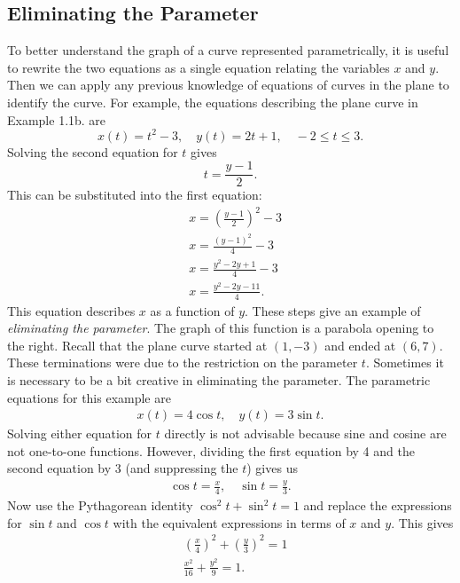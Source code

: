 \documentclass{report}
\begin{document}
    \pagebreak \bigbreak \noindent 
    \subsection{Eliminating the Parameter}
    \bigbreak \noindent 
    To better understand the graph of a curve represented parametrically, it is useful to rewrite the two equations as a single equation relating the variables \( x \) and \( y \). Then we can apply any previous knowledge of equations of curves in the plane to identify the curve. For example, the equations describing the plane curve in Example 1.1b. are
    \[
        x(t) = t^2 - 3, \quad y(t) = 2t + 1, \quad -2 \leq t \leq 3.
    \]
    Solving the second equation for \( t \) gives
    \[
        t = \frac{y - 1}{2}.
    \]
    This can be substituted into the first equation:
    \begin{align*}
        &x = \left(\frac{y-1}{2}\right)^{2} - 3 \\
        &x = \frac{(y-1)^{2}}{4} - 3 \\
        &x = \frac{y^{2}-2y+1}{4}-3 \\
        &x = \frac{y^{2}-2y-11}{4}
    .\end{align*}
    This equation describes \( x \) as a function of \( y \). These steps give an example of \textit{eliminating the parameter}. The graph of this function is a parabola opening to the right. Recall that the plane curve started at \( (1, -3) \) and ended at \( (6, 7) \). These terminations were due to the restriction on the parameter \( t \).
    \bigbreak \noindent 
    Sometimes it is necessary to be a bit creative in eliminating the parameter. The parametric equations for this example are
    \begin{align*}
        x(t) = 4\cos{t}, \quad y(t) = 3\sin{t}
    .\end{align*}
    \bigbreak \noindent 
    Solving either equation for $t$ directly is not advisable because sine and cosine are not one-to-one functions. However, dividing the first equation by 4 and the second equation by 3 (and suppressing the $t$) gives us
    \begin{align*}
        \cos{t} = \frac{x}{4}, \quad \sin{t} = \frac{y}{3}
    .\end{align*}
    \bigbreak \noindent 
    Now use the Pythagorean identity  $\cos^{2}{t} + \sin^{2}{t} = 1$ and replace the expressions for $\sin{t}$ and $\cos{t}$ with the equivalent expressions in terms of $x$ and $y$. This gives
    \begin{align*}
        &\left(\frac{x}{4}\right)^{2} +  \left(\frac{y}{3}\right)^{2} = 1 \\
        &\frac{x^{2}}{16}  + \frac{y^{2}}{9} = 1
    .\end{align*}
\end{document}
